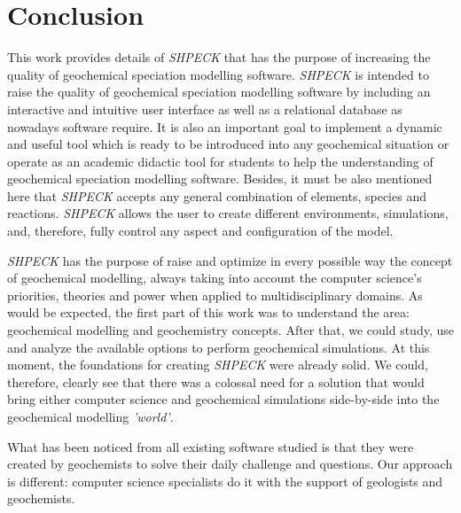 
\chapter{Conclusion}
\label{chapter:conclusion}

This work provides details of \emph{SHPECK} that has the purpose of increasing the quality of geochemical speciation modelling software. \emph{SHPECK} is intended to raise the quality of geochemical speciation modelling software by including an interactive and intuitive user interface as well as a relational database as nowadays software require. It is also an important goal to implement a dynamic and useful tool which is ready to be introduced into any geochemical situation or operate as an academic didactic tool for students  to help the understanding of geochemical speciation modelling software. Besides, it must be also mentioned here that \emph{SHPECK} accepts any general combination of elements, species and reactions. \emph{SHPECK} allows the user to create different environments, simulations, and, therefore,  fully control any aspect and configuration of the model.

\emph{SHPECK} has the purpose of raise and optimize in every possible way the concept of geochemical modelling, always taking into account the computer science's priorities, theories and power when applied to multidisciplinary domains. As would be expected, the first part of this work was to understand the area: geochemical modelling and geochemistry concepts. After that, we could study, use and analyze the available options to perform geochemical simulations. At this moment, the foundations for creating \emph{SHPECK} were already solid. We could, therefore, clearly see that there was a colossal need for a solution that would bring either computer science and geochemical simulations side-by-side into the geochemical modelling \emph{'world'}.

What has been noticed from all existing software studied is that they were created by geochemists to solve their daily challenge and questions. Our approach is different: computer science specialists do it with the support of geologists and geochemists.


